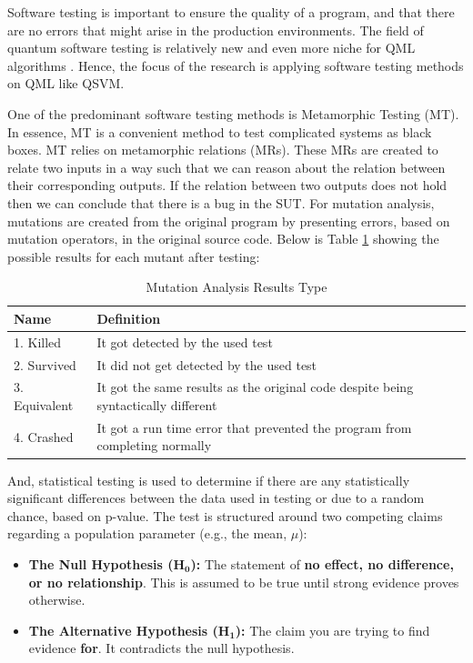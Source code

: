 \documentclass[12pt,a4paper]{article}
\begin{document}
	Software testing is important to ensure the quality of a program, and that there are no errors that might arise in the production environments. The field of quantum software testing is relatively new \cite{paltenghi2024surveytestinganalysisquantum} \cite{10.1145/3712002} and even more niche for QML algorithms \cite{zaman2025surveyquantummachinelearning} \cite{2021APS..MARS32013L}. Hence, the focus of the research is applying software testing methods on QML like QSVM. 
	
	One of the predominant software testing methods is Metamorphic Testing (MT). In essence, MT is a convenient method to test complicated systems as black boxes. MT relies on metamorphic relations (MRs). These MRs are created to relate two inputs in a way such that we can reason about the relation between their corresponding outputs. If the relation between two outputs does not hold then we can conclude that there is a bug in the SUT. For mutation analysis, mutations are created from the original program by presenting errors, based on mutation operators, in the original source code. Below is Table \ref{tab:mutation_analysis} showing the possible results for each mutant after testing:
	
	\begin{table}[h!]
		\centering
		\caption{Mutation Analysis Results Type}
		\label{tab:mutation_analysis}
		\begin{tabular}{|l|l|}
			\hline
			\textbf{Name} & \textbf{Definition} \\
			\hline
			1. Killed &  It got detected by the used test \\
			2.  Survived & It did not get detected by the used test\\
			3. Equivalent & It got the same results as the original code despite being syntactically different \\
			4. Crashed & It got a run time error that prevented the program from completing normally \\
			\hline
		\end{tabular}
	\end{table}
	
	And, statistical testing is used to determine if there are any statistically significant differences between the data used in testing or due to a random chance, based on p-value. The test is structured around two competing claims regarding a population parameter (e.g., the mean, $\mu$):
	
	\begin{itemize}
		\item[$\bullet$] \textbf{The Null Hypothesis ($\mathbf{H_0}$):} The statement of \textbf{no effect, no difference, or no relationship}. This is assumed to be true until strong evidence proves otherwise.
		\item[$\bullet$] \textbf{The Alternative Hypothesis ($\mathbf{H_1}$):} The claim you are trying to find evidence \textbf{for}. It contradicts the null hypothesis.
	\end{itemize}
	
\end{document}
